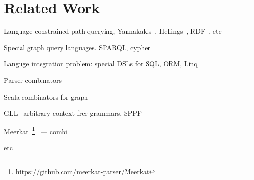 \section{Related Work}

Language-constrained path querying, Yannakakis~\cite{Yannakakis}. 
Hellings~\cite{ConjCFPathQuery, Hellings16}, RDF~\cite{CFGonRDF}, etc~\cite{QueryGraphWithData, RegularDBQuery, GraphQueryWithEarley, FLCpathProblem, graphDB}

Special graph query languages. SPARQL, cypher

Languge integration problem: special DSLs for SQL, ORM, Linq

Parser-combinators

Scala combinators for graph~\cite{ScalaGraphParsing}

GLL~\cite{scott2010gll} arbitrary context-free grammars, SPPF~\cite{SPPF}

Meerkat~\footnote{\url{https://github.com/meerkat-parser/Meerkat}}~\cite{Meerkat} --- combi

etc


